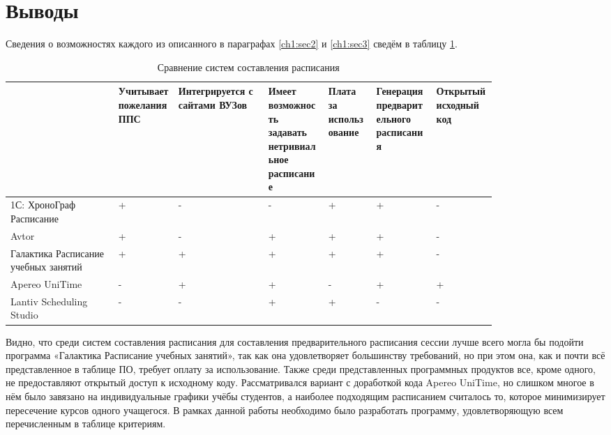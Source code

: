 \section{Выводы} \label{ch1:conclusion}
Сведения о возможностях каждого из описанного в параграфах	\ref{ch1:sec2} и \ref{ch1:sec3} сведём в таблицу \ref{tab:1.4.1}.
\begin{table} [htbp]
	\centering\small
	\caption{Сравнение систем составления расписания}%
	\label{tab:1.4.1}	
	\begin{tabular}{|p{0.18\linewidth}|p{0.1\linewidth}|p{0.15\linewidth}|p{0.1\linewidth}|p{0.08\linewidth}|p{0.1\linewidth}|p{0.1\linewidth}|}
		\hline
		&Учитывает пожелания ППС&Интегрируется с сайтами ВУЗов&Имеет возможность задавать нетривиальное расписание&Плата за использование&Генерация предварительного расписания&Открытый исходный код\\
		\hline
		1С: ХроноГраф Расписание&+&-&-&+&+&-\\ \hline
		Avtor&+&-&+&+&+&-\\ \hline
		Галактика Расписание учебных занятий&+&+&+&+&+&-\\ \hline
		Apereo UniTime&-&+&+&-&+&+\\ \hline
		Lantiv Scheduling Studio&-&-&+&+&-&-\\ \hline	
	\end{tabular}
\end{table}

Видно, что среди систем составления расписания для составления предварительного расписания сессии лучше всего могла бы подойти программа «Галактика Расписание учебных занятий», так как она удовлетворяет большинству требований, но при этом она, как и почти всё представленное в таблице ПО, требует оплату за использование. Также среди представленных программных продуктов все, кроме одного, не предоставляют открытый доступ к исходному коду. Рассматривался вариант с доработкой кода Apereo UniTime, но слишком многое в нём было завязано на индивидуальные графики учёбы студентов, а наиболее подходящим расписанием считалось то, которое минимизирует пересечение курсов одного учащегося.
В рамках данной работы необходимо было разработать программу, удовлетворяющую всем перечисленным в таблице критериям.